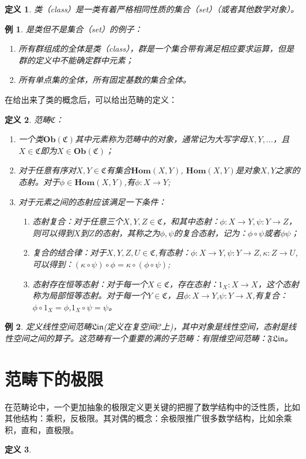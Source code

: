 \documentclass[a4paper]{article}
\newtheorem{example}{例}
\newtheorem{definition}{定义}
\begin{document}
\begin{definition}
类（class）是一类有着严格相同性质的集合（set）（或者其他数学对象）。
\end{definition}
\begin{example}
是类但不是集合（set）的例子：
\begin{enumerate}
    \item 所有群组成的全体是类（class），群是一个集合带有满足相应要求运算，但是群的定义中不能确定群中元素；
    \item 所有单点集的全体，所有固定基数的集合全体。
\end{enumerate}
\end{example}
在给出来了类的概念后，可以给出范畴的定义：
\begin{definition}
范畴$\mathfrak{C}$：
\begin{enumerate}
    \item 一个类$\mathbf{Ob}(\mathfrak{C})$其中元素称为范畴中的对象，通常记为大写字母$X,Y,...$，且$X\in\mathfrak{C}$即为$X\in\mathbf{Ob}(\mathfrak{C})$；
    \item 对于任意有序对$X,Y\in\mathfrak{C}$有集合$\mathbf{Hom}(X,Y)$, $\mathbf{Hom}(X,Y)$是对象$X,Y$之家的态射。对于$\phi\in\mathbf{Hom}(X,Y)$,有$\phi:X\rightarrow Y$;
    \item 对于元素之间的态射应该满足一下条件：
    \begin{enumerate}
        \item 态射复合：对于任意三个$X,Y,Z\in\mathfrak{C}$，和其中态射：$\phi:X\rightarrow Y, \psi:Y\rightarrow Z$，则可以得到$X$到$Z$的态射，其称之为$\phi,\psi$的复合态射，记为：$\phi\circ\psi$或者$\phi\psi$；
        \item 复合的结合律：对于$X,Y,Z,U\in\mathfrak{C}$,有态射：$\phi:X\rightarrow Y,\psi:Y\rightarrow Z, \kappa:Z\rightarrow U$,可以得到：$(\kappa\circ\psi)\circ\phi=\kappa\circ(\phi\circ\psi)$;
        \item 态射存在恒等态射：对于每一个$X\in\mathfrak{C}$，存在态射：$1_{X}:X\rightarrow X$，这个态射称为局部恒等态射。对于每一个$Y\in\mathfrak{C}$，且$\phi:X\rightarrow Y$,$\psi:Y\rightarrow X$,有复合：$\phi\circ 1_{X}=\phi$,$1_{X}\circ\psi=\psi$。
    \end{enumerate}
\end{enumerate}
\end{definition}
\begin{example}
定义线性空间范畴$\mathfrak{Lin}$(定义在复空间$\mathcal{C}$上)，其中对象是线性空间，态射是线性空间之间的算子。这范畴有一个重要的满的子范畴：有限维空间范畴：$\mathfrak{FLin}$。
\end{example}
\section{范畴下的极限}
在范畴论中，一个更加抽象的极限定义更关键的把握了数学结构中的泛性质，比如其他结构：乘积，反极限。其对偶的概念：余极限推广很多数学结构，比如余乘积，直和，直极限。

\begin{definition}
\end{definition}
\end{document}
